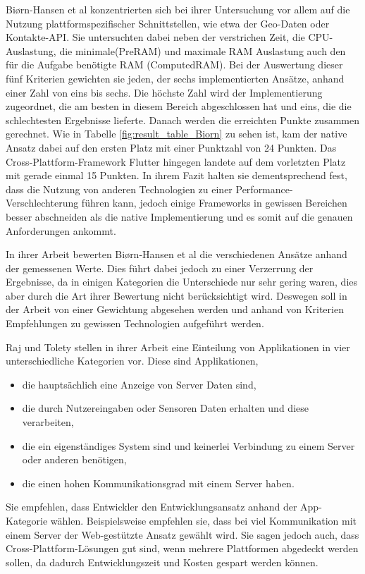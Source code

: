 Biørn-Hansen et al \cite{BirnHansen.2020} konzentrierten sich bei ihrer Untersuchung vor allem auf die Nutzung plattformspezifischer Schnittstellen, wie etwa der Geo-Daten oder Kontakte-API. Sie untersuchten dabei neben der verstrichen Zeit, die CPU-Auslastung, die minimale(PreRAM) und maximale RAM Auslastung auch den für die Aufgabe benötigte RAM (ComputedRAM). Bei der Auswertung dieser fünf Kriterien gewichten sie jeden, der sechs implementierten Ansätze, anhand einer Zahl von eins bis sechs. Die höchste Zahl wird der Implementierung zugeordnet, die am besten in diesem Bereich abgeschlossen hat und eins, die die schlechtesten Ergebnisse lieferte. Danach werden die erreichten Punkte zusammen gerechnet. Wie in Tabelle \ref{fig:result_table_Biorn} zu sehen ist, kam der native Ansatz dabei auf den ersten Platz mit einer Punktzahl von 24 Punkten. Das Cross-Plattform-Framework Flutter hingegen landete auf dem vorletzten Platz mit gerade einmal 15 Punkten. In ihrem Fazit halten sie dementsprechend fest, dass die Nutzung von anderen Technologien zu einer Performance-Verschlechterung führen kann, jedoch einige Frameworks in gewissen Bereichen besser abschneiden als die native Implementierung und es somit auf die genauen Anforderungen ankommt.

In ihrer Arbeit bewerten Biørn-Hansen et al \cite{BirnHansen.2020} die verschiedenen Ansätze anhand der gemessenen Werte. Dies führt dabei jedoch zu einer Verzerrung der Ergebnisse, da in einigen Kategorien die Unterschiede nur sehr gering waren, dies aber durch die Art ihrer Bewertung nicht berücksichtigt wird. Deswegen soll in der Arbeit von einer Gewichtung abgesehen werden und anhand von Kriterien Empfehlungen zu gewissen Technologien aufgeführt werden.

Raj und Tolety \cite{IEEE_Rahul_Seshu} stellen in ihrer Arbeit eine Einteilung von Applikationen in vier unterschiedliche Kategorien vor. Diese sind Applikationen,
\begin{itemize}
    \item die hauptsächlich eine Anzeige von Server Daten sind,
    \item die durch Nutzereingaben oder Sensoren Daten erhalten und diese verarbeiten,
    \item die ein eigenständiges System sind und keinerlei Verbindung zu einem Server oder anderen benötigen,
    \item die einen hohen Kommunikationsgrad mit einem Server haben.
\end{itemize}
Sie empfehlen, dass Entwickler den Entwicklungsansatz anhand der App-Kategorie wählen. Beispielsweise empfehlen sie, dass bei viel Kommunikation mit einem Server der Web-gestützte Ansatz gewählt wird. Sie sagen jedoch auch, dass Cross-Plattform-Lösungen gut sind, wenn mehrere Plattformen abgedeckt werden sollen, da dadurch Entwicklungszeit und Kosten gespart werden können.

